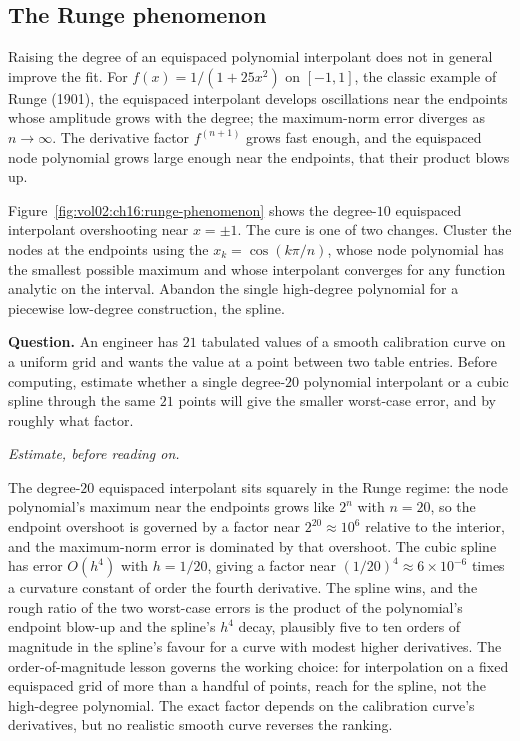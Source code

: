 \subsection{The Runge phenomenon}

Raising the degree of an equispaced polynomial interpolant does not
in general improve the fit. For $f(x) = 1/(1 + 25 x^{2})$ on
$[-1, 1]$, the classic example of Runge (1901), the equispaced
interpolant develops oscillations near the endpoints whose amplitude
grows with the degree; the maximum-norm error diverges as $n \to
\infty$. The derivative factor $f^{(n+1)}$ grows fast enough, and
the equispaced node polynomial grows large enough near the
endpoints, that their product blows up.



Figure~\ref{fig:vol02:ch16:runge-phenomenon} shows the
degree-$10$ equispaced interpolant overshooting near $x = \pm 1$.
The cure is one of two changes. Cluster the nodes at the endpoints
using the  $x_{k} = \cos(k\pi/n)$, whose
node polynomial has the smallest possible maximum and whose
interpolant converges for any function analytic on the interval.
Abandon the single high-degree polynomial for a piecewise low-degree
construction, the spline.

\begin{estimation}
\textbf{Question.} An engineer has $21$ tabulated values of a smooth
calibration curve on a uniform grid and wants the value at a point
between two table entries. Before computing, estimate whether a
single degree-$20$ polynomial interpolant or a cubic spline through
the same $21$ points will give the smaller worst-case error, and by
roughly what factor.

\smallskip
\textit{Estimate, before reading on.}

\smallskip
The degree-$20$ equispaced interpolant sits squarely in the Runge
regime: the node polynomial's maximum near the endpoints grows like
$2^{n}$ with $n = 20$, so the endpoint overshoot is governed by a
factor near $2^{20} \approx 10^{6}$ relative to the interior, and
the maximum-norm error is dominated by that overshoot. The cubic
spline has error $O(h^{4})$ with $h = 1/20$, giving a factor near
$(1/20)^{4} \approx 6 \times 10^{-6}$ times a curvature constant of
order the fourth derivative. The spline wins, and the rough ratio of
the two worst-case errors is the product of the polynomial's
endpoint blow-up and the spline's $h^{4}$ decay, plausibly five to
ten orders of magnitude in the spline's favour for a curve with
modest higher derivatives. The order-of-magnitude lesson governs the
working choice: for interpolation on a fixed equispaced grid of more
than a handful of points, reach for the spline, not the high-degree
polynomial. The exact factor depends on the calibration curve's
derivatives, but no realistic smooth curve reverses the ranking.
\end{estimation}

